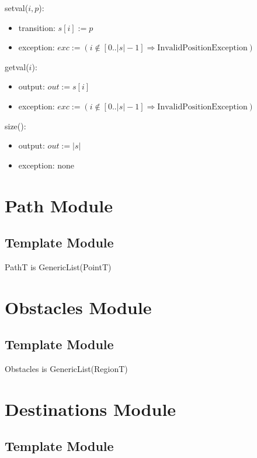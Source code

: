 \documentclass[12pt]{article}
\begin{document}
\noindent setval($i, p$):
\begin{itemize}
\item transition: $s[i] := p$
\item exception: $exc := (i \notin [0..|s|-1] \Rightarrow \mathrm{InvalidPositionException})$
\end{itemize}

\noindent getval($i$):
\begin{itemize}
\item output: $out := s[i]$
\item exception: $exc := (i \notin [0..|s|-1] \Rightarrow \mathrm{InvalidPositionException})$
\end{itemize}

\noindent size():
\begin{itemize}
\item output: $out := | s |$
\item exception: none
\end{itemize}

\newpage

\section* {Path Module}

\subsection* {Template Module}

PathT is GenericList(PointT)

\section* {Obstacles Module}

\subsection* {Template Module}

Obstacles is GenericList(RegionT)

\section* {Destinations Module}

\subsection* {Template Module}
\end{document}
